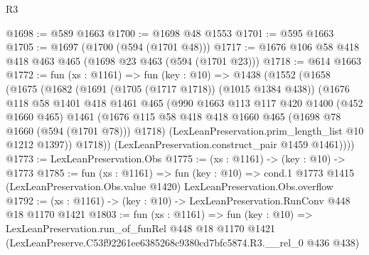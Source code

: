 \begin{lexlean}{R3}
\begin{coremodule}
@1698 := @589 @1663
@1700 := @1698 @48 @1553
@1701 := @595 @1663
@1705 := @1697 (@1700 (@594 (@1701 @48)))
@1717 := @1676 @106 @58 @418 @418 @463 @465 (@1698 @23 @463 (@594 (@1701 @23)))
@1718 := @614 @1663
@1772 := fun (xs : @1161) =>
  fun (key : @10) =>
  @1438
    (@1552
      (@1658
        (@1675
          (@1682
            (@1691 (@1705 (@1717 @1718)) (@1015 @1384 @438))
            (@1676
              @118
              @58
              @1401
              @418
              @1461
              @465
              (@990
                @1663
                @113
                @117
                @420
                @1400
                (@452 @1660 @465)
                @1461
                (@1676 @115 @58 @418 @418 @1660 @465 (@1698 @78 @1660 (@594 (@1701 @78))) @1718)
                (LexLeanPreservation.prim_length_list @10 @1212 @1397))
              @1718))
          (LexLeanPreservation.construct_pair @1459 @1461))))
@1773 := LexLeanPreservation.Obs
@1775 := (xs : @1161) -> (key : @10) -> @1773
@1785 := fun (xs : @1161) =>
  fun (key : @10) =>
  cond.{1} @1773 @1415 (LexLeanPreservation.Obs.value @1420) LexLeanPreservation.Obs.overflow
@1792 := (xs : @1161) -> (key : @10) -> LexLeanPreservation.RunConv @448 @18 @1170 @1421
@1803 := fun (xs : @1161) =>
  fun (key : @10) =>
  LexLeanPreservation.run_of_funRel
    @448
    @18
    @1170
    @1421
    (LexLeanPreserve.C53f92261ee6385268c9380cd7bfc5874.R3.__rel_0 @436 @438)
\end{coremodule}
\end{lexlean}
